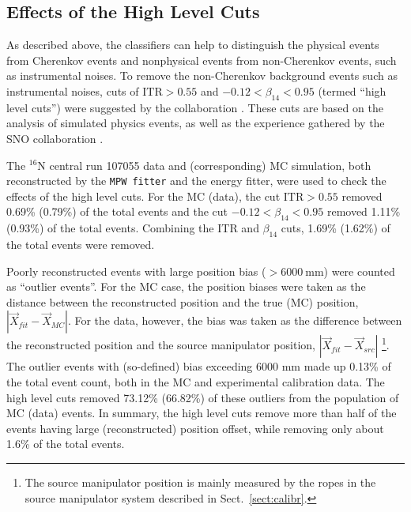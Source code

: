 \subsection{Effects of the High Level Cuts}

As described above, the classifiers can help to distinguish the physical events from Cherenkov events and nonphysical events from non-Cherenkov events, such as instrumental noises. To remove the non-Cherenkov background events such as instrumental noises, cuts of $\mathrm{ITR}>0.55$ and $-0.12<\beta_{14}<0.95$ (termed ``high level cuts'') were suggested by the collaboration \cite{waterunidoc}. These cuts are based on the analysis of simulated physics events, as well as the experience gathered by the SNO collaboration \cite{waterunidoc,dunmore2004separation,marzec2019measurement}. %

The $^{16}$N central run 107055 data and (corresponding) MC simulation, both reconstructed by the \texttt{MPW fitter} and the energy fitter, were used to check the effects of the high level cuts. For the MC (data), the cut $\mathrm{ITR}>0.55$ removed 0.69\% (0.79\%) of the total events and the cut $-0.12<\beta_{14}<0.95$ removed 1.11\% (0.93\%) of the total events. Combining the ITR and $\beta_{14}$ cuts, 1.69\% (1.62\%) of the total events were removed.

Poorly reconstructed events with large position bias ($>6000~$mm) were counted as ``outlier events''. For the MC case, the position biases were taken as the distance between the reconstructed position and the true (MC) position, $|\vec{X}_{fit}-\vec{X}_{MC}|$. For the data, however, the bias was taken as the difference between the reconstructed position and the source manipulator position, $|\vec{X}_{fit}-\vec{X}_{src}|$ \footnote{The source manipulator position is mainly measured by the ropes in the source manipulator system described in Sect.~\ref{sect:calibr}.}. The outlier events with (so-defined) bias exceeding 6000 mm made up 0.13\% of the total event count, both in the MC and experimental calibration data. The high level cuts removed 73.12\% (66.82\%) of these outliers from the population of MC (data) events. In summary, the high level cuts remove more than half of the events having large (reconstructed) position offset, while removing only about 1.6\% of the total events.

